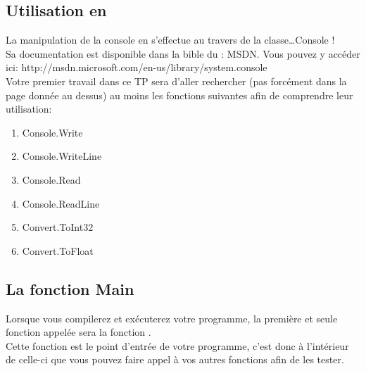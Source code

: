 \subsection{Utilisation en \csharp}
La manipulation de la console en \csharp s'effectue au travers de la
classe\ldots Console !\\
Sa documentation est disponible dans la bible du \csharp: MSDN.
Vous pouvez y accéder ici:
http://msdn.microsoft.com/en-us/library/system.console\\
Votre premier travail dans ce TP sera d'aller rechercher (pas forcément dans
la page donnée au dessus) au moins les fonctions suivantes afin de comprendre
leur utilisation:

\begin{enumerate}
    \item Console.Write
    \item Console.WriteLine
    \item Console.Read
    \item Console.ReadLine
    \item Convert.ToInt32
    \item Convert.ToFloat
\end{enumerate}

\subsection{La fonction Main}
Lorsque vous compilerez et exécuterez votre programme, la première et seule 
fonction appelée sera la fonction .\\
Cette fonction est le point d'entrée de votre programme, c'est donc à l'intérieur
de celle-ci que vous pouvez faire appel à vos autres fonctions afin de les tester.

\newpage
